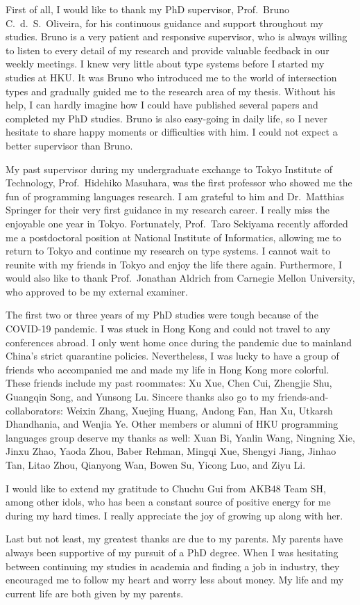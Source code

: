First of all, I would like to thank my PhD supervisor, Prof.\ Bruno C.\ d.\ S.\
Oliveira, for his continuous guidance and support throughout my studies. Bruno
is a very patient and responsive supervisor, who is always willing to listen to
every detail of my research and provide valuable feedback in our weekly
meetings. I knew very little about type systems before I started my studies at
HKU. It was Bruno who introduced me to the world of intersection types and
gradually guided me to the research area of my thesis. Without his help, I can
hardly imagine how I could have published several papers and completed my PhD
studies. Bruno is also easy-going in daily life, so I never hesitate to share
happy moments or difficulties with him. I could not expect a better supervisor
than Bruno.

My past supervisor during my undergraduate exchange to Tokyo Institute of
Technology, Prof.\ Hidehiko Masuhara, was the first professor who showed me the
fun of programming languages research. I am grateful to him and Dr.\ Matthias
Springer for their very first guidance in my research career. I really miss the
enjoyable one year in Tokyo. Fortunately, Prof.\ Taro Sekiyama recently afforded
me a postdoctoral position at National Institute of Informatics, allowing me to
return to Tokyo and continue my research on type systems. I cannot wait to
reunite with my friends in Tokyo and enjoy the life there again. Furthermore, I
would also like to thank Prof.\ Jonathan Aldrich from Carnegie Mellon University,
who approved to be my external examiner.

The first two or three years of my PhD studies were tough because of the COVID-19
pandemic. I was stuck in Hong Kong and could not travel to any conferences
abroad. I only went home once during the pandemic due to mainland China's
strict quarantine policies. Nevertheless, I was lucky to have a group of friends
who accompanied me and made my life in Hong Kong more colorful. These friends
include my past roommates: Xu Xue, Chen Cui, Zhengjie Shu, Guangqin Song, and
Yunsong Lu. Sincere thanks also go to my friends-and-collaborators: Weixin
Zhang, Xuejing Huang, Andong Fan, Han Xu, Utkarsh Dhandhania, and Wenjia Ye.
Other members or alumni of HKU programming languages group deserve my thanks as
well: Xuan Bi, Yanlin Wang, Ningning Xie, Jinxu Zhao, Yaoda Zhou, Baber Rehman,
Mingqi Xue, Shengyi Jiang, Jinhao Tan, Litao Zhou, Qianyong Wan, Bowen Su,
Yicong Luo, and Ziyu Li.

I would like to extend my gratitude to Chuchu Gui from AKB48 Team SH, among
other idols, who has been a constant source of positive energy for me during my
hard times. I really appreciate the joy of growing up along with her.

Last but not least, my greatest thanks are due to my parents. My parents have
always been supportive of my pursuit of a PhD degree. When I was hesitating
between continuing my studies in academia and finding a job in industry, they
encouraged me to follow my heart and worry less about money. My life and my
current life are both given by my parents.

